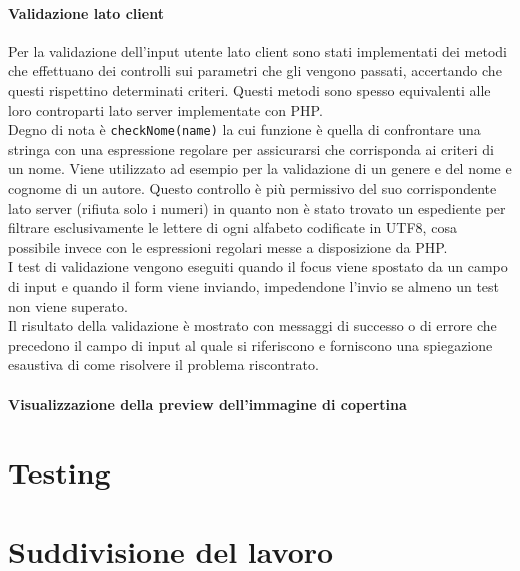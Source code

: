 \documentclass[12pt,a4paper,headings=optiontohead]{article}
\begin{document}
	\paragraph{Validazione lato client}
	Per la validazione dell'input utente lato client sono stati implementati dei metodi che effettuano dei controlli sui parametri che gli vengono passati, accertando che questi rispettino determinati criteri. Questi metodi sono spesso equivalenti alle loro controparti lato server implementate con PHP. \\
	Degno di nota è \texttt{checkNome(name)} la cui funzione è quella di confrontare una stringa con una espressione regolare per assicurarsi che corrisponda ai criteri di un nome. Viene utilizzato ad esempio per la validazione di un genere e del nome e cognome di un autore. Questo controllo è più permissivo del suo corrispondente lato server (rifiuta solo i numeri) in quanto non è stato trovato un espediente per filtrare esclusivamente le lettere di ogni alfabeto codificate in UTF8, cosa possibile invece con le espressioni regolari messe a disposizione da PHP.\\
	I test di validazione vengono eseguiti quando il focus viene spostato da un campo di input e quando il form viene inviando, impedendone l'invio se almeno un test non viene superato.\\
	Il risultato della validazione è mostrato con messaggi di successo o di errore che precedono il campo di input al quale si riferiscono e forniscono una spiegazione esaustiva di come risolvere il problema riscontrato.
	
	\paragraph{Visualizzazione della preview dell'immagine di copertina} %
	
	\section{Testing}
	
	\section{Suddivisione del lavoro}
	
	
\end{document}
